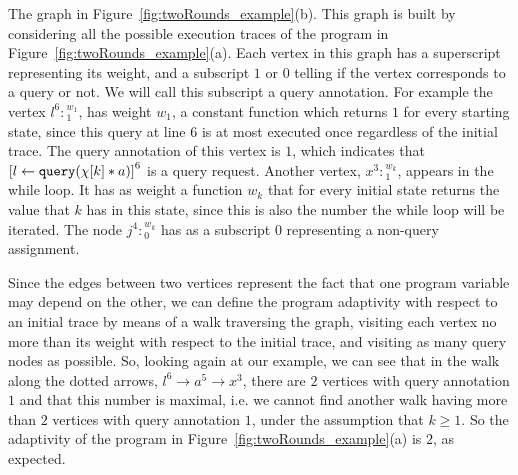 \begin{example}[twoRounds]
   The graph in Figure~\ref{fig:twoRounds_example}(b). This graph is built by considering all the possible execution traces of the program in Figure~\ref{fig:twoRounds_example}(a).
   Each vertex in this graph has a superscript representing its weight, and a subscript $1$ or $0$ telling if the vertex corresponds to a query or not. We will call this subscript a query annotation. 
   For example the vertex $l^{6}:{}^{w_1}_1$, 
   has weight $w_1$, a constant function which returns $1$ for every starting state, since 
   this query at line $6$ is at most executed once regardless of the initial trace.
   The query annotation of this vertex is $1$, which indicates that 
   $\clabel{\assign{l}{\query(\chi[k] * a)}}^6$ is a query request.
   Another vertex, $x^{3}:{}^{w_k}_1$, appears in the while loop. 
   It has as weight a function $w_k$ that for every initial state returns the value that $k$ has in this state, since this is also the number the while loop will be iterated. 
   The node $j^{4}:{}^{w_k}_0$ has as a subscript $0$ representing a non-query assignment.
   
   
   Since the edges between two vertices represent the fact that one program variable may depend on the other,
   we can define the program adaptivity with respect to an initial trace by means of a walk traversing the graph, visiting each vertex no more than its weight with respect to the initial trace, and visiting as many query nodes as possible.
   So, looking again at our example, we can see that
   in the walk along the dotted arrows, $l^{6} \to a^5 \to x^3 $, there are $2$ vertices with query annotation $1$ and that this number is maximal, i.e. we cannot find another walk having more than $2$ vertices with query annotation $1$, under the assumption that $k \geq 1$. So the adaptivity of the program in Figure~\ref{fig:twoRounds_example}(a) is $2$,
   as expected.
  

\end{example}
